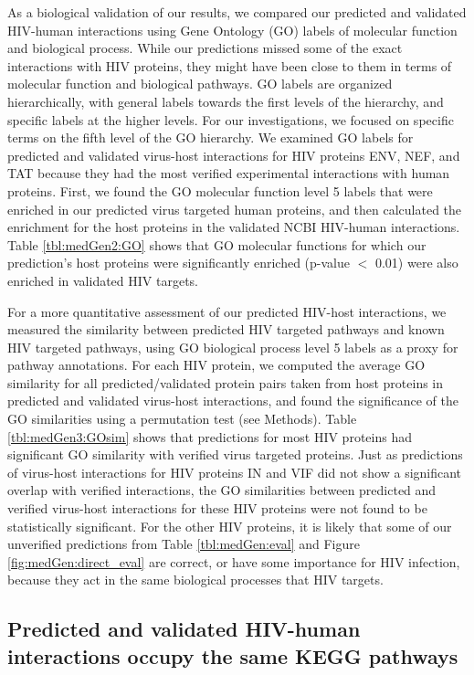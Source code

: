 As a biological validation of our results, we compared our predicted
and validated HIV-human interactions using Gene Ontology (GO) labels
of molecular function and biological process. While our predictions
missed some of the exact interactions with HIV proteins, they might
have been close to them in terms of molecular function and biological
pathways. GO labels are organized hierarchically, with general labels
towards the first levels of the hierarchy, and specific labels at the
higher levels. For our investigations, we focused on specific terms on
the fifth level of the GO hierarchy. We examined GO labels for
predicted and validated virus-host interactions for HIV proteins ENV,
NEF, and TAT because they had the most verified experimental
interactions with human proteins. First, we found the GO molecular
function level 5 labels that were enriched in our predicted virus
targeted human proteins, and then calculated the enrichment for the
host proteins in the validated NCBI HIV-human interactions. Table
\ref{tbl:medGen2:GO} shows that GO molecular functions for which our
prediction's host proteins were significantly enriched (p-value $<$
0.01) were also enriched in validated HIV targets.



For a more quantitative assessment of our predicted HIV-host
interactions, we measured the similarity between predicted HIV
targeted pathways and known HIV targeted pathways, using GO biological
process level 5 labels as a proxy for pathway annotations. For each
HIV protein, we computed the average GO similarity for all
predicted/validated protein pairs taken from host proteins in
predicted and validated virus-host interactions, and found the
significance of the GO similarities using a permutation test (see
Methods). Table \ref{tbl:medGen3:GOsim} shows that predictions for
most HIV proteins had significant GO similarity with verified virus
targeted proteins. Just as predictions of virus-host interactions for
HIV proteins IN and VIF did not show a significant overlap with
verified interactions, the GO similarities between predicted and
verified virus-host interactions for these HIV proteins were not found
to be statistically significant. For the other HIV proteins, it is
likely that some of our unverified predictions from Table
\ref{tbl:medGen:eval} and Figure \ref{fig:medGen:direct_eval} are
correct, or have some importance for HIV infection, because they act
in the same biological processes that HIV targets.

\subsection{Predicted and validated HIV-human interactions occupy the same KEGG pathways}

